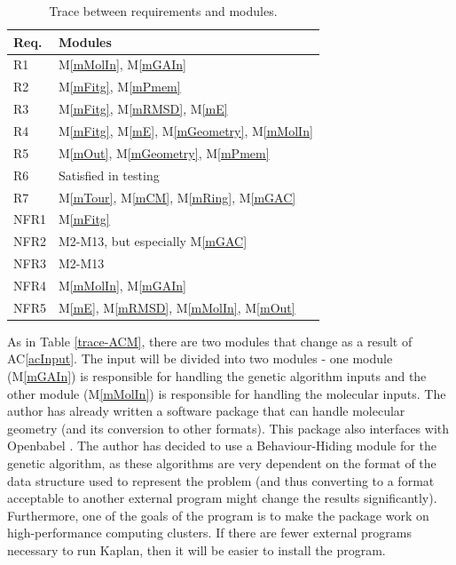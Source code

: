 \documentclass[12pt, titlepage]{article}
\newcommand{\acref}[1]{AC\ref{#1}}
\newcommand{\mref}[1]{M\ref{#1}}
\newcommand{\progname}{Kaplan} %
\begin{document}
\begin{table}[H]
\centering
\begin{tabular}{p{} p{}}
\toprule
\textbf{Req.} & \textbf{Modules}\\
\midrule
R1 & \mref{mMolIn}, \mref{mGAIn} \\
R2 & \mref{mFitg}, \mref{mPmem} \\
R3 & \mref{mFitg}, \mref{mRMSD}, \mref{mE} \\
R4 & \mref{mFitg}, \mref{mE}, \mref{mGeometry}, \mref{mMolIn} \\
R5 & \mref{mOut}, \mref{mGeometry}, \mref{mPmem} \\
R6 & Satisfied in testing \\
R7 & \mref{mTour}, \mref{mCM}, \mref{mRing}, \mref{mGAC} \\
NFR1 & \mref{mFitg} \\
NFR2 & M2-M13, but especially \mref{mGAC} \\
NFR3 & M2-M13 \\
NFR4 & \mref{mMolIn}, \mref{mGAIn} \\
NFR5 & \mref{mE}, \mref{mRMSD}, \mref{mMolIn}, \mref{mOut} \\
\bottomrule
\end{tabular}
\caption{Trace between requirements and modules.}
\label{TblRT}
\end{table}

As in Table \ref{trace-ACM}, there are two modules that change as a result of 
\acref{acInput}. The input will be divided into two modules - one module 
(\mref{mGAIn}) is responsible for handling the genetic algorithm inputs and the 
other module (\mref{mMolIn}) is responsible for handling the molecular inputs. 
The author has already written a software package that can handle molecular 
geometry (and its conversion to other formats). This package also interfaces 
with Openbabel \cite{obabel}. The author has decided to use a Behaviour-Hiding 
module for the genetic algorithm, as these algorithms are very dependent on the 
format of the data structure used to represent the problem (and thus converting 
to a format acceptable to another external program might change the results 
significantly). Furthermore, one of the goals of the program is to make the 
package work on high-performance computing clusters. If there are fewer 
external programs necessary to run \progname{}, then it will be easier to 
install the program.
\end{document}
